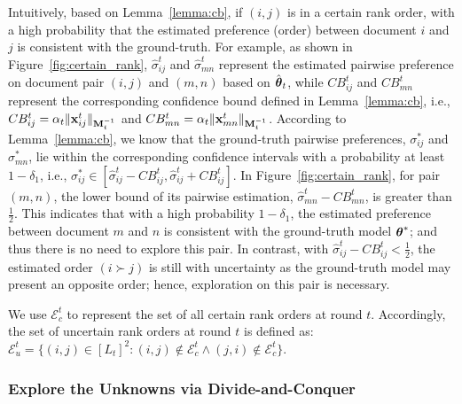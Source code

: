 Intuitively, based on Lemma~\ref{lemma:cb}, if $(i, j)$ is in a certain rank order, with a high probability that the estimated preference (order) between document $i$ and $j$ is consistent with the ground-truth. 
For example, as shown in Figure~\ref{fig:certain_rank}, $\hat{\sigma}^t_{ij}$ and $\hat{\sigma}_{mn}^t$ represent the estimated pairwise preference on document pair $(i,j)$ and $(m,n)$ based on $\hat{\boldsymbol{\theta}}_t$, while $CB_{ij}^t$ and $CB_{mn}^t$ represent the corresponding confidence bound defined in Lemma~\ref{lemma:cb}, i.e., $CB_{ij}^t = \alpha_t\Vert{\mathbf{x}_{ij}^t}\Vert_{\mathbf{M}_t^{-1}}$ and $CB_{mn}^t = \alpha_t\Vert{\mathbf{x}_{mn}^t}\Vert_{\mathbf{M}_t^{-1}}$. According to Lemma~\ref{lemma:cb},  we know that the ground-truth pairwise preferences, $\sigma_{ij}^*$ and $\sigma_{mn}^*$, lie within the corresponding confidence intervals with a probability at least $1 - \delta_1$, i.e., $\sigma_{ij}^* \in [\hat{\sigma}_{ij}^t - CB_{ij}^t, \hat{\sigma}_{ij}^t + CB_{ij}^t]$. 
In Figure~\ref{fig:certain_rank}, for pair $(m, n)$, the lower bound of its pairwise estimation, $\hat{\sigma}_{mn}^t - CB_{mn}^t$, is greater than $\frac{1}{2}$. This indicates that with a high probability $1 - \delta_1$, the estimated preference between document $m$ and $n$ is consistent with the ground-truth model $\boldsymbol{\theta}^*$; and thus there is no need to explore this pair. In contrast, with $\hat{\sigma}_{ij}^t - CB_{ij}^t < \frac{1}{2}$, the estimated order $(i \succ j)$ is still with uncertainty as the ground-truth model may present an opposite order; hence, exploration on this pair is necessary. 

We use $\mathcal{E}_{c}^t$ to represent the set of all certain rank orders at round $t$. Accordingly, the set of uncertain rank orders at round $t$ is defined as: $\mathcal{E}_{u}^t = \{(i, j) \in [L_t]^2: (i, j) \notin \mathcal{E}_c^t \wedge (j, i) \notin \mathcal{E}_c^t\}$. 

\subsubsection{Explore the Unknowns via Divide-and-Conquer}

